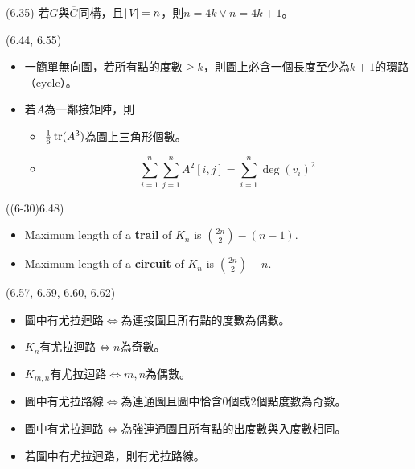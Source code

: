 \item \begin{theorem}{(6.35)} 若$G$與$\overline{G}$同構，且$|\textit{V}| = n$，則$n = 4k \lor n = 4k + 1$。
\end{theorem}

\item \begin{theorem}{(6.44, 6.55)} \quad\quad
    \begin{itemize}
        \item 一簡單無向圖，若所有點的度數$\ge k$，則圖上必含一個長度至少為$k + 1$的環路（cycle）。
        \item 若$A$為一鄰接矩陣，則\begin{itemize}
            \item $\frac{1}{6}\operatorname{tr}(A^3)$為圖上三角形個數。
            \item \begin{equation}
                \sum_{i = 1}^{n}\sum_{j = 1}^{n} A^2[i, j] = \sum_{i = 1}^{n} \deg(v_i)^2
            \end{equation}
        \end{itemize}
    \end{itemize}
\end{theorem}

\item \begin{theorem}{((6-30)6.48)} \quad\quad
    \begin{itemize}
        \item Maximum length of a \textbf{trail} of $K_n$ is $\binom{2n}{2} - (n - 1)$.
        \item Maximum length of a \textbf{circuit} of $K_n$ is $\binom{2n}{2} - n$.
    \end{itemize}
\end{theorem}

\item \begin{theorem}{(6.57, 6.59, 6.60, 6.62)} \quad\quad
    \begin{itemize}
        \item 圖中有尤拉迴路$\iff$為連接圖且所有點的度數為偶數。
        \item $K_n$有尤拉迴路$\iff$$n$為奇數。
        \item $K_{m, n}$有尤拉迴路$\iff$$m, n$為偶數。
        \item 圖中有尤拉路線$\iff$為連通圖且圖中恰含$0$個或$2$個點度數為奇數。
        \item 圖中有尤拉迴路$\iff$為強連通圖且所有點的出度數與入度數相同。
        \item 若圖中有尤拉迴路，則有尤拉路線。
    \end{itemize}
\end{theorem}

